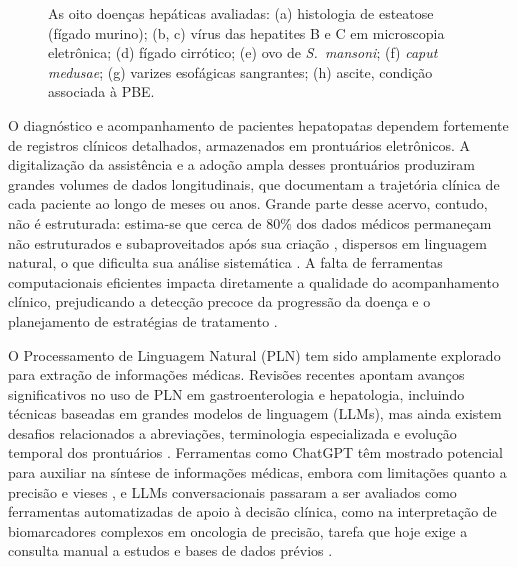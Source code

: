 \begin{figure}[!htbp]
\centering

\caption[Imagens das oito doenças hepáticas avaliadas]{As oito doenças hepáticas avaliadas: (a) histologia de esteatose (fígado murino); (b, c) vírus das hepatites B e C em microscopia eletrônica; (d) fígado cirrótico; (e) ovo de \textit{S.~mansoni}; (f) \textit{caput medusae}; (g) varizes esofágicas sangrantes; (h) ascite, condição associada à PBE.}
\label{fig:intro-doencas}
\par{}
\end{figure}

O diagnóstico e acompanhamento de pacientes hepatopatas dependem fortemente de registros clínicos detalhados, armazenados em prontuários eletrônicos. A digitalização da assistência e a adoção ampla desses prontuários produziram grandes volumes de dados longitudinais, que documentam a trajetória clínica de cada paciente ao longo de meses ou anos. Grande parte desse acervo, contudo, não é estruturada: estima-se que cerca de 80\% dos dados médicos permaneçam não estruturados e subaproveitados após sua criação \citep{kong2019}, dispersos em linguagem natural, o que dificulta sua análise sistemática \citep{schneider2023}. A falta de ferramentas computacionais eficientes impacta diretamente a qualidade do acompanhamento clínico, prejudicando a detecção precoce da progressão da doença e o planejamento de estratégias de tratamento \citep{hou2014}.

O Processamento de Linguagem Natural (PLN) tem sido amplamente explorado para extração de informações médicas. Revisões recentes apontam avanços significativos no uso de PLN em gastroenterologia e hepatologia, incluindo técnicas baseadas em grandes modelos de linguagem (LLMs), mas ainda existem desafios relacionados a abreviações, terminologia especializada e evolução temporal dos prontuários \citep{stammers2025,shahab2024}. Ferramentas como ChatGPT têm mostrado potencial para auxiliar na síntese de informações médicas, embora com limitações quanto a precisão e vieses \citep{dave2023}, e LLMs conversacionais passaram a ser avaliados como ferramentas automatizadas de apoio à decisão clínica, como na interpretação de biomarcadores complexos em oncologia de precisão, tarefa que hoje exige a consulta manual a estudos e bases de dados prévios \citep{benary2023}.

